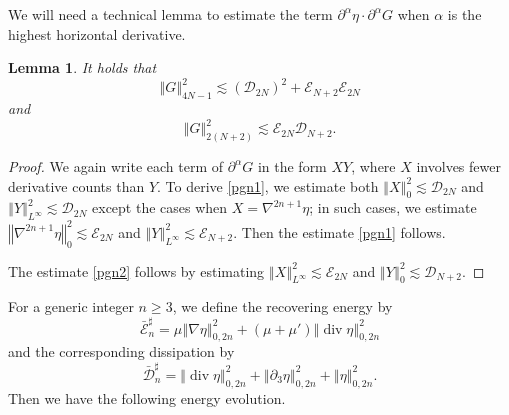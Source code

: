 \documentclass[a4paper,reqno,11pt]{amsart}
\numberwithin{equation}{section}
\providecommand{\norm}[1]{\left\Vert#1\right\Vert}
\providecommand{\sd}[1]{\mathcal{D}_{#1}}
\providecommand{\se}[1]{\mathcal{E}_{#1}}
\providecommand{\norm}[1]{\left\Vert#1\right\Vert}
\newtheorem{lem}{Lemma}[section]
\begin{document}
We will need a technical lemma to estimate the term ${\partial}^{\alpha} \eta \cdot  {\partial}^{\alpha} G$ when $\alpha$ is the highest horizontal derivative.
\begin{lem}\label{p_G_estimatesc22}
It holds that
\begin{equation}\label{pgn1}
\norm{  G }_{4N-1}^2     {\lesssim} (\sd{2N})^2+  \se{N+2}    \se{2N}
\end{equation}
and
\begin{equation}\label{pgn2}
\norm{  G }_{2(N+2)}^2   {\lesssim}\se{2N}   \sd{N+2}.
\end{equation}
\end{lem}
\begin{proof}
We again write each term of ${\partial}^\alpha G$ in the form $X Y$, where $X$ involves fewer derivative counts than $Y$.
To derive \eqref{pgn1}, we estimate both $\norm{X}_{0}^2{\lesssim} \sd{2N}$ and $\norm{Y}_{L^\infty}^2{\lesssim} \sd{2N}$ except the cases when $X=\nabla^{2n+1}\eta$; in such cases, we estimate $\norm{\nabla^{2n+1}\eta}_{0}^2{\lesssim} \se{2N}$ and $\norm{Y}_{L^\infty}^2{\lesssim} \se{N+2}$. Then the estimate \eqref{pgn1} follows.

The estimate \eqref{pgn2}
 follows by estimating $\norm{X}_{L^\infty}^2{\lesssim} \se{2N}$ and $\norm{Y}_{0}^2{\lesssim} \sd{N+2}$.
 \end{proof}

For a generic integer $n\ge 3$, we define the recovering energy by
\begin{equation}
 \bar{\mathcal{E}}^\sharp_{n} =    \mu  \norm{ \nabla  \eta}_{0,2n}^2 +(\mu+\mu')\norm{ \operatorname{div} \eta}_{0,2n}^2
\end{equation}
and the corresponding dissipation by
\begin{equation}
 \bar{\mathcal{D}}_n^\sharp =  \norm{   \operatorname{div} \eta}_{0,2n }^2 +  \norm{ {\partial}_3\eta}_{0,2n }^2
  +  \norm{  \eta }_{0,2n}^2.
\end{equation}
Then we have the following energy evolution.
\end{document}

